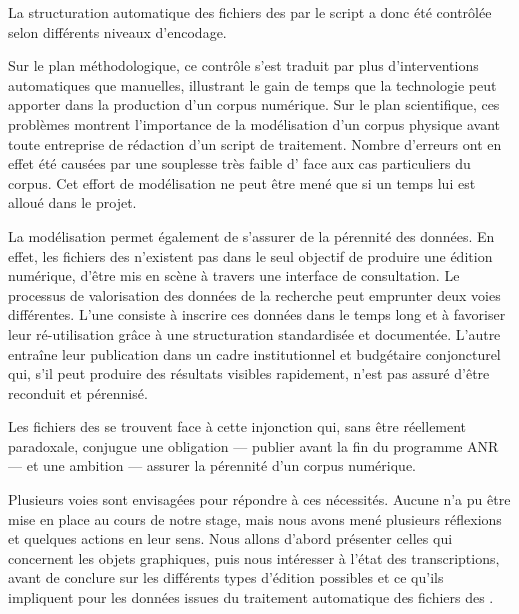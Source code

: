 
La structuration automatique des fichiers des \odm{} par le script \lse{} a donc été contrôlée selon différents niveaux d'encodage.

Sur le plan méthodologique, ce contrôle s'est traduit par plus d'interventions automatiques que manuelles, illustrant le gain de temps que la technologie peut apporter dans la production d'un corpus numérique. Sur le plan scientifique, ces problèmes montrent l'importance de la modélisation d'un corpus physique avant toute entreprise de rédaction d'un script de traitement. Nombre d'erreurs ont en effet été causées par une souplesse très faible d'\lse{} face aux cas particuliers du corpus. Cet effort de modélisation ne peut être mené que si un temps lui est alloué dans le projet.

La modélisation permet également de s'assurer de la pérennité des données. En effet, les fichiers des \odm{} n'existent pas dans le seul objectif de produire une édition numérique, \cad{} d'être mis en scène à travers une interface de consultation. Le processus de valorisation des données de la recherche peut emprunter deux voies différentes. L'une consiste à inscrire ces données dans le temps long et à favoriser leur ré-utilisation grâce à une structuration standardisée et documentée. L'autre entraîne leur publication dans un cadre institutionnel et budgétaire conjoncturel qui, s'il peut produire des résultats visibles rapidement, n'est pas assuré d'être reconduit et pérennisé.

Les fichiers des \odm{} se trouvent face à cette injonction qui, sans être réellement paradoxale, conjugue une obligation --- publier avant la fin du programme ANR \timeus{} --- et une ambition --- assurer la pérennité d'un corpus numérique.

Plusieurs voies sont envisagées pour répondre à ces nécessités. Aucune n'a pu être mise en place au cours de notre stage, mais nous avons mené plusieurs réflexions et quelques actions en leur sens. Nous allons d'abord présenter celles qui concernent les objets graphiques, puis nous intéresser à l'état des transcriptions, avant de conclure sur les différents types d'édition possibles et ce qu'ils impliquent pour les données issues du traitement automatique des fichiers des \odm.


\newpage
\thispagestyle{empty}
\mbox{}
\newpage